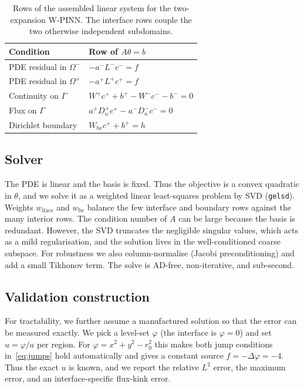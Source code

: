 \documentclass[preprint,12pt,authoryear]{elsarticle}
\begin{document}
\begin{table}[t]
\centering
\begin{tabular}{l l}
\hline
Condition & Row of $A\theta=b$ \\
\hline
PDE residual in $\Omega^-$ & $-a^- L^- c^- = f$ \\
PDE residual in $\Omega^+$ & $-a^+ L^+ c^+ = f$ \\
Continuity on $\Gamma$ & $W^+ c^+ + b^+ - W^- c^- - b^- = 0$ \\
Flux on $\Gamma$ & $a^+ D_n^+ c^+ - a^- D_n^- c^- = 0$ \\
Dirichlet boundary & $W_{\mathrm{bc}} c^+ + b^+ = h$ \\
\hline
\end{tabular}
\caption{Rows of the assembled linear system for the two-expansion W-PINN. The interface rows couple the two otherwise independent subdomains.}
\label{tab:rows}
\end{table}

\subsection{Solver}
\label{subsec:solver}
The PDE is linear and the basis is fixed. Thus the objective is a convex quadratic in $\theta$, and we solve it as a weighted linear least-squares problem by SVD (\texttt{gelsd}). Weights $w_{\mathrm{iface}}$ and $w_{\mathrm{bc}}$ balance the few interface and boundary rows against the many interior rows. The condition number of $A$ can be large because the basis is redundant. However, the SVD truncates the negligible singular values, which acts as a mild regularisation, and the solution lives in the well-conditioned coarse subspace. For robustness we also column-normalise (Jacobi preconditioning) and add a small Tikhonov term. The solve is AD-free, non-iterative, and sub-second.

\subsection{Validation construction}
\label{subsec:mms}
For tractability, we further assume a manufactured solution so that the error can be measured exactly. We pick a level-set $\varphi$ (the interface is $\varphi=0$) and set $u=\varphi/a$ per region. For $\varphi=x^2+y^2-r_0^2$ this makes both jump conditions in~\eqref{eq:jumps} hold automatically and gives a constant source $f=-\Delta\varphi=-4$. Thus the exact $u$ is known, and we report the relative $L^2$ error, the maximum error, and an interface-specific flux-kink error.
\end{document}
